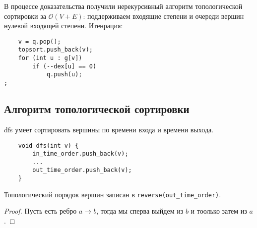 В процессе доказательства получили нерекурсивный алгоритм топологической сортировки за $\mathcal{O}(V+E)$: поддерживаем входящие степени и очереди вершин нулевой входящей степени. Итенрация:

\begin{lstlisting}
    v = q.pop();
    topsort.push_back(v);
    for (int u : g[v])
        if (--dex[u] == 0)
            q.push(u);
;\end{lstlisting}

\subsection*{Алгоритм топологической сортировки}
dfs умеет сортировать вершины по времени входа и времени выхода.

\begin{lstlisting}
    void dfs(int v) {
        in_time_order.push_back(v);
        ...
        out_time_order.push_back(v);
    }
\end{lstlisting}

Топологический порядок вершин записан в \lstinline!reverse(out_time_order)!.

\begin{proof}
    Пусть есть ребро $a\rightarrow b$, тогда мы сперва выйдем из $b$ и тоолько затем из $a$.
\end{proof}
